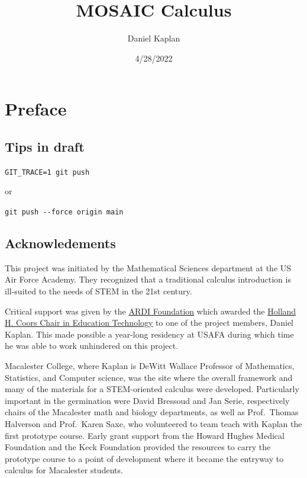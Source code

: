 \documentclass[
  letterpaper,
  DIV=11,
  numbers=noendperiod,
  oneside]{scrreprt}
\title{MOSAIC Calculus}
\author{Daniel Kaplan}
\date{4/28/2022}
\renewcommand*\contentsname{Table of contents}
\begin{document}
\maketitle

\ifdefined\Shaded\renewenvironment{Shaded}{\begin{tcolorbox}[borderline west={3pt}{0pt}{shadecolor}, boxrule=0pt, enhanced, frame hidden, interior hidden, sharp corners]}{\end{tcolorbox}}\fi

\renewcommand*\contentsname{Table of contents}
{
\hypersetup{linkcolor=}
\setcounter{tocdepth}{2}
\tableofcontents
}
\hypertarget{preface}{%
\chapter*{Preface}\label{preface}}

\hypertarget{tips-in-draft}{%
\section*{Tips in draft}\label{tips-in-draft}}

\texttt{GIT\_TRACE=1\ git\ push}

or

\texttt{git\ push\ -\/-force\ origin\ main}

\hypertarget{acknowledements}{%
\section*{Acknowledements}\label{acknowledements}}

This project was initiated by the Mathematical Sciences department at
the US Air Force Academy. They recognized that a traditional calculus
introduction is ill-suited to the needs of STEM in the 21st century.

Critical support was given by the \href{http://ardifoundation.org}{ARDI
Foundation} which awarded the
\href{http://www.ardifoundation.org/coors-chair/}{Holland H. Coors Chair
in Education Technology} to one of the project members, Daniel Kaplan.
This made possible a year-long residency at USAFA during which time he
was able to work unhindered on this project.

Macalester College, where Kaplan is DeWitt Wallace Professor of
Mathematics, Statistics, and Computer science, was the site where the
overall framework and many of the materials for a STEM-oriented calculus
were developed. Particularly important in the germination were David
Bressoud and Jan Serie, respectively chairs of the Macalester math and
biology departments, as well as Prof.~Thomas Halverson and Prof.~Karen
Saxe, who volunteered to team teach with Kaplan the first prototype
course. Early grant support from the Howard Hughes Medical Foundation
and the Keck Foundation provided the resources to carry the prototype
course to a point of development where it became the entryway to
calculus for Macalester students.
\end{document}
